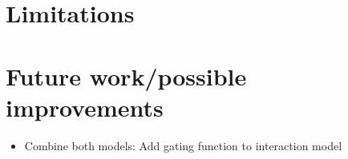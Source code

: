 
\section{Limitations}

\section{Future work/possible improvements}

\begin{itemize}
\item Combine both models: Add gating function to interaction model
\end{itemize}